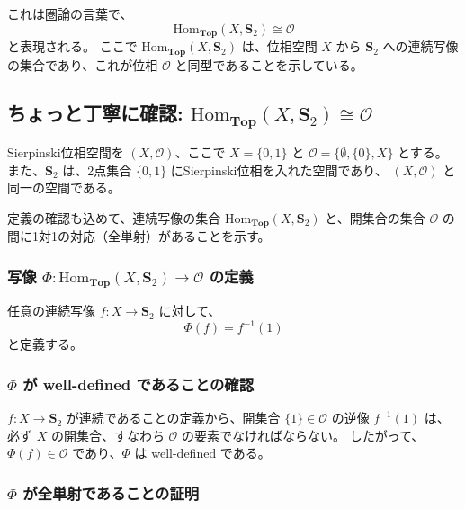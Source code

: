 \documentclass[uplatex,a4j,12pt,dvipdfmx]{jsarticle}
\begin{document}
これは圏論の言葉で、
$$
	\mathrm{Hom}_{\mathbf{Top}}(X, \mathbf{S}_ {2}) \cong \mathcal{O}
$$
と表現される。
ここで $\mathrm{Hom}_{\mathbf{Top}}(X, \mathbf{S}_ {2})$ は、位相空間 $X$ から $\mathbf{S}_ {2}$ への連続写像の集合であり、これが位相 $\mathcal{O}$ と同型であることを示している。


\subsection{\texorpdfstring{ちょっと丁寧に確認: $\mathrm{Hom}_{\mathbf{Top}}(X, \mathbf{S}_ {2}) \cong \mathcal{O}$}{ちょっと丁寧に証明: Hom(X, 2) is isomorphic to O}}

Sierpinski位相空間を $(X, \mathcal{O})$、ここで $X = \{0, 1\}$ と $\mathcal{O} = \{\emptyset, \{0\}, X\}$ とする。
また、$\mathbf{S}_ {2}$ は、2点集合 $\{0, 1\}$ にSierpinski位相を入れた空間であり、 $(X, \mathcal{O})$ と同一の空間である。

定義の確認も込めて、連続写像の集合 $\mathrm{Hom}_{\mathbf{Top}}(X, \mathbf{S}_ {2})$ と、開集合の集合 $\mathcal{O}$ の間に1対1の対応（全単射）があることを示す。

\subsubsection*{写像 $\Phi: \mathrm{Hom}_{\mathbf{Top}}(X, \mathbf{S}_ {2}) \to \mathcal{O}$ の定義}

任意の連続写像 $f: X \to \mathbf{S}_ {2}$ に対して、
$$ \Phi(f) = f^{-1}(1) $$
と定義する。

\subsubsection*{$\Phi$ が well-defined であることの確認}

$f: X \to \mathbf{S}_ {2}$ が連続であることの定義から、開集合 $\{1\} \in \mathcal{O}$ の逆像 $f^{-1}(1)$ は、必ず $X$ の開集合、すなわち $\mathcal{O}$ の要素でなければならない。
したがって、$\Phi(f) \in \mathcal{O}$ であり、$\Phi$ は well-defined である。

\subsubsection*{$\Phi$ が全単射であることの証明}
\end{document}
